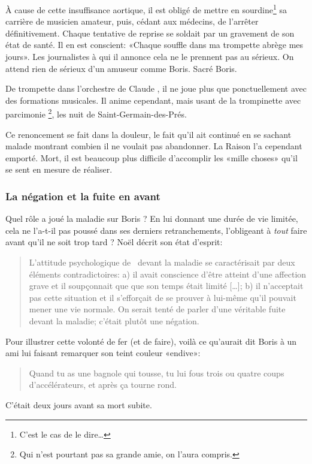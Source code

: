À cause de cette insuffisance aortique, il est obligé de mettre en sourdine\footnote{C'est le cas
de le dire\ldots} sa carrière de musicien amateur, puis, cédant aux médecins, de l'arrêter
définitivement. Chaque tentative de reprise se soldait par un gravement de son état de santé.
Il en est conscient: «Chaque souffle dans ma trompette abrège mes jours». Les journalistes à
qui il annonce cela ne le prennent pas au sérieux. On attend rien de sérieux d'un
amuseur comme Boris. Sacré Boris.

De trompette dans l'orchestre de Claude , il ne joue plus que ponctuellement avec des
formations musicales. Il anime cependant, mais usant de la trompinette avec parcimonie
\footnote{Qui n'est pourtant pas sa grande amie, on l'aura compris.}, les nuit de Saint-Germain-des-Prés.


Ce renoncement se fait dans la douleur, le fait qu'il ait continué en se sachant malade montrant
combien il ne voulait pas abandonner. La Raison l'a cependant emporté. Mort, il est beaucoup
plus difficile d'accomplir les «mille choses» qu'il se sent en mesure de réaliser.

\subsubsection{La négation et la fuite en avant}

Quel rôle a joué la maladie sur Boris ? En lui donnant une durée de vie limitée, cela
ne l'a-t-il pas poussé dans ses derniers retranchements, l'obligeant à \emph{tout} faire
avant qu'il ne soit trop tard ? Noël  décrit son état d'esprit:
{\small
\begin{quotation}
L'attitude psychologique de \BV\ devant la maladie se caractérisait par deux éléments
contradictoires: a) il avait conscience d'être atteint d'une affection grave et il soupçonnait que
que son temps était limité [\ldots]; b) il n'acceptait pas cette situation et il s'efforçait de se
prouver à lui-même qu'il pouvait mener une vie normale. On serait tenté de parler d'une
véritable fuite devant la maladie; c'était plutôt une négation.
\end{quotation}
}
Pour illustrer cette volonté de fer (et de faire), voilà ce qu'aurait dit
Boris à un ami lui faisant remarquer son teint couleur «endive»:
{\small
\begin{quotation}
Quand tu as une bagnole qui tousse, tu lui fous trois ou quatre coups d'accélérateurs,
et après ça tourne rond.
\end{quotation}
}
C'était deux jours avant sa mort subite.


